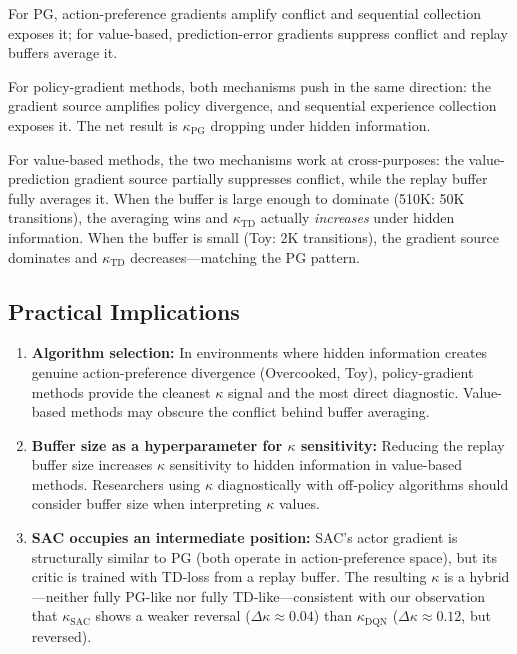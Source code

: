 \documentclass[letterpaper]{article}
\begin{document}
For PG, action-preference gradients amplify conflict and sequential collection exposes it; for value-based, prediction-error gradients suppress conflict and replay buffers average it.

For policy-gradient methods, both mechanisms push in the same direction: the gradient source amplifies policy divergence, and sequential experience collection exposes it. The net result is $\kappa_{\text{PG}}$ dropping under hidden information.

For value-based methods, the two mechanisms work at cross-purposes: the value-prediction gradient source partially suppresses conflict, while the replay buffer fully averages it. When the buffer is large enough to dominate (510K: 50K transitions), the averaging wins and $\kappa_{\text{TD}}$ actually \textit{increases} under hidden information. When the buffer is small (Toy: 2K transitions), the gradient source dominates and $\kappa_{\text{TD}}$ decreases---matching the PG pattern.

\subsection{Practical Implications}

\begin{enumerate}
\item \textbf{Algorithm selection:} In environments where hidden information creates genuine action-preference divergence (Overcooked, Toy), policy-gradient methods provide the cleanest $\kappa$ signal and the most direct diagnostic. Value-based methods may obscure the conflict behind buffer averaging.
\item \textbf{Buffer size as a hyperparameter for $\kappa$ sensitivity:} Reducing the replay buffer size increases $\kappa$ sensitivity to hidden information in value-based methods. Researchers using $\kappa$ diagnostically with off-policy algorithms should consider buffer size when interpreting $\kappa$ values.
\item \textbf{SAC occupies an intermediate position:} SAC's actor gradient is structurally similar to PG (both operate in action-preference space), but its critic is trained with TD-loss from a replay buffer. The resulting $\kappa$ is a hybrid---neither fully PG-like nor fully TD-like---consistent with our observation that $\kappa_{\text{SAC}}$ shows a weaker reversal ($\Delta \kappa \approx 0.04$) than $\kappa_{\text{DQN}}$ ($\Delta \kappa \approx 0.12$, but reversed).
\end{enumerate}
\end{document}
